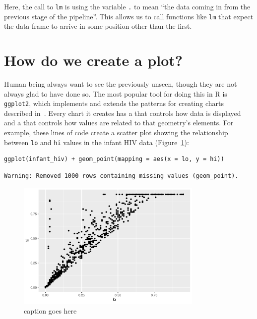\noindent
Here, the call to \texttt{lm} is using the variable \texttt{.} to mean
``the data coming in from the previous stage of the pipeline''.
This allows us to call functions like \texttt{lm}
that expect the data frame to arrive in some position other than the first.

\section{How do we create a plot?}

Human being always want to see the previously unseen,
though they are not always glad to have done so.
The most popular tool for doing this in R is \texttt{ggplot2},
which implements and extends the patterns for creating charts described in~\citet{Wilk2005}.
Every chart it creates has a  that controls how data is displayed
and a  that controls how values are related to that geometry's elements.
For example,
these lines of code create a scatter plot
showing the relationship between \texttt{lo} and \texttt{hi} values in the infant HIV data
(Figure~\ref{fig:basic-plot-1}):

\begin{lstlisting}
ggplot(infant_hiv) + geom_point(mapping = aes(x = lo, y = hi))
\end{lstlisting}

\begin{lstlisting}
Warning: Removed 1000 rows containing missing values (geom_point).
\end{lstlisting}

\begin{figure}[h]
  \includegraphics[width=0.8\textwidth]{figures/tidyverse/basic-plot-1.pdf}
  \caption{caption goes here}
  \label{fig:basic-plot-1}
\end{figure}

